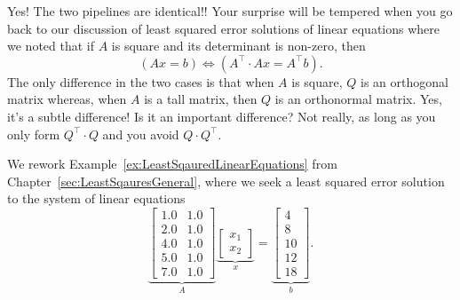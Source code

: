 Yes! The two pipelines are identical!! Your surprise will be tempered when you go back to our discussion of least squared error solutions of linear equations where we noted that if $A$ is square and its determinant is non-zero, then
$$(Ax=b) \iff (A^\top \cdot A x = A^\top b). $$
The only difference in the two cases is that when $A$ is square, $Q$ is an orthogonal matrix whereas, when $A$ is a tall matrix, then $Q$ is an orthonormal matrix. Yes, it's a subtle difference! Is it an important difference? Not really, as long as you only form $Q^\top \cdot Q$ and you avoid $Q \cdot Q^\top.$

\begin{example}
\label{ex:LeastSqaresQR}
We rework Example~\ref{ex:LeastSqauredLinearEquations} from 
Chapter~\ref{sec:LeastSqauresGeneral}, where we seek a least squared error solution to the system of linear equations
\begin{equation}
\label{eq:LeastSquareSolExampleAgain}
\underbrace{\left[\begin{array}{rrr}
 1.0 & 1.0 \\
 2.0 & 1.0 \\
 4.0 & 1.0 \\
 5.0 & 1.0 \\
 7.0  & 1.0
 \end{array}\right]}_{A} \underbrace{\left[\begin{array}{c}
x_1 \\ x_2  \end{array}\right]}_{x} =  \underbrace{\left[\begin{array}{r}
4 \\  8 \\ 10 \\ 12 \\ 18 \end{array}\right]}_{b}.
\end{equation}

\end{example}

